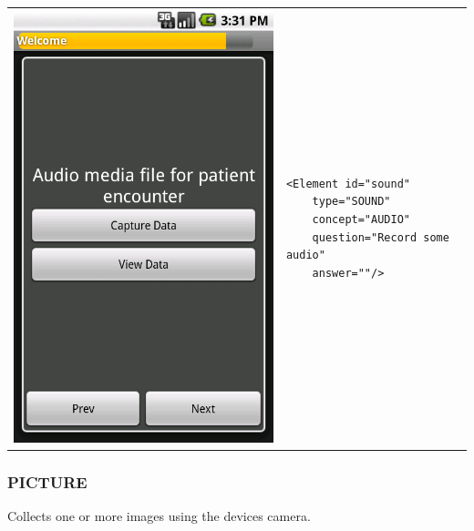 \documentclass[a4paper,10pt]{article}
\begin{document}
\noindent\begin{tabular}{ p{3.5cm}  p{7.5cm} }
\includegraphics[scale=0.2,keepaspectratio=true]{client_audio.png}
& \begin{verbatim}
<Element id="sound"
    type="SOUND"  
    concept="AUDIO"  
    question="Record some audio"  
    answer=""/>\end{verbatim}
\end{tabular}

\subsubsection{PICTURE} Collects one or more images using the devices camera. 
\end{document}
